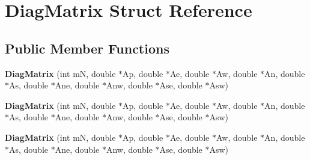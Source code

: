 \hypertarget{struct_diag_matrix}{}\section{Diag\+Matrix Struct Reference}
\label{struct_diag_matrix}
\subsection*{Public Member Functions}
\begin{DoxyCompactItemize}
\item 
\hypertarget{struct_diag_matrix_ab6dc06d826631b61093bf448873fee7c}{}{\bfseries Diag\+Matrix} (int m\+N, double $\ast$Ap, double $\ast$Ae, double $\ast$Aw, double $\ast$An, double $\ast$As, double $\ast$Ane, double $\ast$Anw, double $\ast$Ase, double $\ast$Asw)\label{struct_diag_matrix_ab6dc06d826631b61093bf448873fee7c}

\item 
\hypertarget{struct_diag_matrix_ab6dc06d826631b61093bf448873fee7c}{}{\bfseries Diag\+Matrix} (int m\+N, double $\ast$Ap, double $\ast$Ae, double $\ast$Aw, double $\ast$An, double $\ast$As, double $\ast$Ane, double $\ast$Anw, double $\ast$Ase, double $\ast$Asw)\label{struct_diag_matrix_ab6dc06d826631b61093bf448873fee7c}

\item 
\hypertarget{struct_diag_matrix_ab6dc06d826631b61093bf448873fee7c}{}{\bfseries Diag\+Matrix} (int m\+N, double $\ast$Ap, double $\ast$Ae, double $\ast$Aw, double $\ast$An, double $\ast$As, double $\ast$Ane, double $\ast$Anw, double $\ast$Ase, double $\ast$Asw)\label{struct_diag_matrix_ab6dc06d826631b61093bf448873fee7c}

\end{DoxyCompactItemize}
